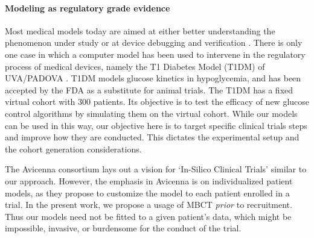 \paragraph{Modeling as regulatory grade evidence}
\label{sec:related work}
Most medical models today are aimed at either better understanding the phenomenon under study \cite{vfiborganization_Tusscher07} or at device debugging and verification \cite{VHM_proc}. 
There is only one case in which a computer model has been used to intervene in the regulatory process of medical devices, namely the T1 Diabetes Model (T1DM) of UVA/PADOVA \cite{T1DM}.
T1DM models glucose kinetics in hypoglycemia, and has been accepted by the FDA as a substitute for animal trials.
The T1DM has a fixed virtual cohort with 300 patients.
Its objective is to test the efficacy of new glucose control algorithms by simulating them on the virtual cohort.
While our models can be used in this way, our objective here is to target specific clinical trials steps and improve how they are conducted.
This dictates the experimental setup and the cohort generation considerations.

The Avicenna consortium \cite{Avicenna} lays out a vision for `In-Silico Clinical Trials' similar to our approach.
However, the emphasis in Avicenna is on individualized patient models, as they propose to customize the model to each patient enrolled in a trial.
In the present work, we propose a usage of MBCT \emph{prior} to recruitment.
Thus our models need not be fitted to a given patient's data, which might be impossible, invasive, or burdensome for the conduct of the trial.
